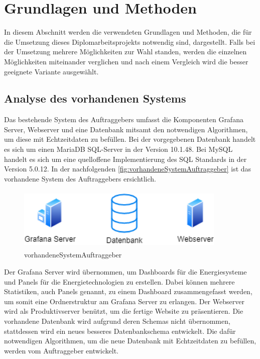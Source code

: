 \chapter{Grundlagen und Methoden} 
In diesem Abschnitt werden die verwendeten Grundlagen und Methoden, die für die Umsetzung dieses Diplomarbeitsprojekts notwendig sind, dargestellt. Falls bei der Umsetzung mehrere Möglichkeiten zur Wahl standen, werden die einzelnen Möglichkeiten miteinander verglichen und nach einem Vergleich wird die besser geeignete Variante ausgewählt.


\section{Analyse des vorhandenen Systems}
Das bestehende System des Auftraggebers umfasst die Komponenten Grafana Server, Webserver und eine Datenbank mitsamt den notwendigen Algorithmen, um diese mit Echtzeitdaten zu befüllen. Bei der vorgegebenen Datenbank handelt es sich um einen MariaDB SQL-Server in der Version 10.1.48. Bei MySQL handelt es sich um eine quelloffene Implementierung des SQL Standards in der Version 5.0.12. In der nachfolgenden \autoref{fig:vorhandeneSystemAuftraggeber}  ist das vorhandene System des Auftraggebers ersichtlich.
\newline

\begin{figure}[h]
	\centering
	\includegraphics[height=3cm,width=10cm]{images/vorhandeneSystemAuftraggeber}
	\caption{vorhandeneSystemAuftraggeber}
	\label{fig:vorhandeneSystemAuftraggeber}
\end{figure}
Der Grafana Server wird übernommen, um Dashboards für die Energiesysteme und Panels für die Energietechnologien zu erstellen. Dabei können mehrere Statistiken, auch Panels genannt, zu einem Dashboard zusammengefasst werden, um somit eine Ordnerstruktur am Grafana Server zu erlangen. Der Webserver wird als Produktivserver benützt, um die fertige Website zu präsentieren. Die vorhandene Datenbank wird aufgrund deren Schemas nicht übernommen, stattdessen wird ein neues besseres Datenbankschema entwickelt. Die dafür notwendigen Algorithmen, um die neue Datenbank mit Echtzeitdaten zu befüllen, werden vom Auftraggeber entwickelt.



